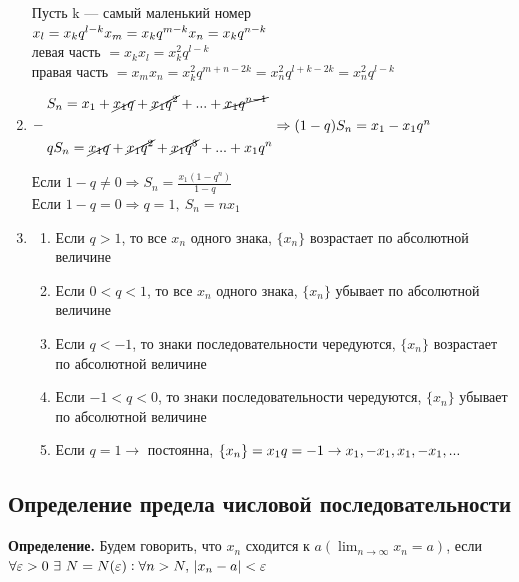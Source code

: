 \documentclass{article}
\begin{document}
\begin{enumerate}
        Пусть k --- самый маленький номер\\
        \(x_l = x_k q^{l-k}\\
        x_m = x_k q^{m-k}\\
        x_n = x_k q^{n-k}\)\\
        левая часть \(= x_k x_l = x_k^2 q^{l-k}\)\\
        правая часть \(= x_m x_n = x_k^2 q^{m + n - 2k} = x_n^2 q^{l + k - 2k} = x_n^2 q^{l-k}\)
        \item \(\begin{aligned}
        	&\quad S_n = x_1 + \cancel{x_1 q} + \cancel{x_1 q^2} + ... + \cancel{x_1 q^{n-1}}\\
            & -\\
            &\quad q S_n = \cancel{x_1 q} + \cancel{x_1 q^2} + \cancel{x_1 q^3} + ... + x_1 q^n
            \end{aligned} \Rightarrow (1-q)S_n = x_1 - x_1 q^n\)
            
            Если \(1 - q \not = 0 \Rightarrow S_n = \frac{x_1(1-q^n)}{1-q}\)\\
            Если \(1 - q = 0 \Rightarrow q = 1,\ S_n = n x_1\)
        \item \begin{enumerate}
        	\item Если \(q > 1\), то все \(x_n\) одного знака, \(\{x_n\}\) возрастает по абсолютной величине
            \item Если \(0 < q < 1\), то все \(x_n\) одного знака, \(\{x_n\}\) убывает по абсолютной величине
            \item Если \(q < -1\), то знаки последовательности чередуются, \(\{x_n\}\) возрастает по абсолютной величине
            \item Если \(-1 < q < 0\), то знаки последовательности чередуются, \(\{x_n\}\) убывает по абсолютной величине
            \item Если \(q = 1 \rightarrow\) постоянна, \(\{x_n\} = x_1\\ q = -1 \rightarrow x_1, -x_1, x_1, -x_1, ...\)
        \end{enumerate}
    \end{enumerate}
    
    \subsection{Определение предела числовой последовательности}
    
    \textbf{Определение.} Будем говорить, что \( x_n \) сходится к \( a(\lim_{n \to \infty} x_n = a) \), если \( \forall \varepsilon > 0 \ \exists \  N = N(\varepsilon): \forall n > N,\ \abs{x_n - a} < \varepsilon \)
    
\end{document}
